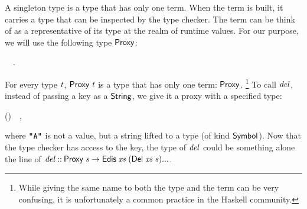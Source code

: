 A singleton type is a type that has only one term. When the term is built, it
carries a type that can be inspected by the type checker. The term can be think
of as a representative of its type at the realm of runtime values. For our
purpose, we will use the following type \ensuremath{\Conid{Proxy}}:
\begin{hscode}\SaveRestoreHook
{}%
%
\>[B]{}\;\;\mathrel{=}~~.{}\<[E]%
\ColumnHook
\end{hscode}\resethooks
For every type \ensuremath{\Varid{t}}, \ensuremath{\Conid{Proxy}\;\Varid{t}} is a type that has only one term: \ensuremath{\Conid{Proxy}}.%
\footnote{While giving the same name to both the type and the term can be very
confusing, it is unfortunately a common practice in the Haskell community.}
To call \ensuremath{\Varid{del}}, instead of passing a key as a \ensuremath{\Conid{String}}, we give it a proxy with
a specified type:
\begin{hscode}\SaveRestoreHook
{}%
%
\>[B]{}\;(\mathbin{::}\;)~~,{}\<[E]%
\ColumnHook
\end{hscode}\resethooks
where \ensuremath{\text{\tt \char34 A\char34}} is not a value, but a string lifted to a type (of kind \ensuremath{\Conid{Symbol}}).
Now that the type checker has access to the key, the type of \ensuremath{\Varid{del}} could be
something alone the line of \ensuremath{\Varid{del}\mathbin{::}\Conid{Proxy}\;\Varid{s}\to \Conid{Edis}\;\Varid{xs}\;(\Conid{Del}\;\Varid{xs}\;\Varid{s})\mathbin{...}}.

